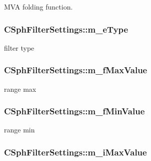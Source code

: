 M\-V\-A folding function. 

\hypertarget{classCSphFilterSettings_ae212f4330154407a5700c4123aacaebc}{
\subsubsection[{m\-\_\-e\-Type}]{ C\-Sph\-Filter\-Settings\-::m\-\_\-e\-Type}}\label{classCSphFilterSettings_ae212f4330154407a5700c4123aacaebc}


filter type 

\hypertarget{classCSphFilterSettings_a74624f4727af1cbdec318a3cb967d53f}{
\subsubsection[{m\-\_\-f\-Max\-Value}]{ C\-Sph\-Filter\-Settings\-::m\-\_\-f\-Max\-Value}}\label{classCSphFilterSettings_a74624f4727af1cbdec318a3cb967d53f}


range max 

\hypertarget{classCSphFilterSettings_a9c0bbe23d0ed8c48e411ddc51038677a}{
\subsubsection[{m\-\_\-f\-Min\-Value}]{ C\-Sph\-Filter\-Settings\-::m\-\_\-f\-Min\-Value}}\label{classCSphFilterSettings_a9c0bbe23d0ed8c48e411ddc51038677a}


range min 

\hypertarget{classCSphFilterSettings_a02b61305bfbc6ae22f0d7bcb0c4ec8b0}{
\subsubsection[{m\-\_\-i\-Max\-Value}]{ C\-Sph\-Filter\-Settings\-::m\-\_\-i\-Max\-Value}}\label{classCSphFilterSettings_a02b61305bfbc6ae22f0d7bcb0c4ec8b0}


